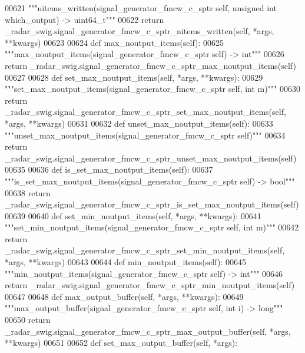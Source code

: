 \begin{DoxyCode}
{{{{00621         \textcolor{stringliteral}{"""nitems\_written(signal\_generator\_fmcw\_c\_sptr self, unsigned int which\_output) -> uint64\_t"""}
00622         \textcolor{keywordflow}{return} \_radar\_swig.signal\_generator\_fmcw\_c\_sptr\_nitems\_written(self, *args, **kwargs)
00623 
00624     \textcolor{keyword}{def }max_noutput_items(self):
00625         \textcolor{stringliteral}{"""max\_noutput\_items(signal\_generator\_fmcw\_c\_sptr self) -> int"""}
00626         \textcolor{keywordflow}{return} \_radar\_swig.signal\_generator\_fmcw\_c\_sptr\_max\_noutput\_items(self)
00627 
00628     \textcolor{keyword}{def }set_max_noutput_items(self, *args, **kwargs):
00629         \textcolor{stringliteral}{"""set\_max\_noutput\_items(signal\_generator\_fmcw\_c\_sptr self, int m)"""}
00630         \textcolor{keywordflow}{return} \_radar\_swig.signal\_generator\_fmcw\_c\_sptr\_set\_max\_noutput\_items(self, *args, **kwargs)
00631 
00632     \textcolor{keyword}{def }unset_max_noutput_items(self):
00633         \textcolor{stringliteral}{"""unset\_max\_noutput\_items(signal\_generator\_fmcw\_c\_sptr self)"""}
00634         \textcolor{keywordflow}{return} \_radar\_swig.signal\_generator\_fmcw\_c\_sptr\_unset\_max\_noutput\_items(self)
00635 
00636     \textcolor{keyword}{def }is_set_max_noutput_items(self):
00637         \textcolor{stringliteral}{"""is\_set\_max\_noutput\_items(signal\_generator\_fmcw\_c\_sptr self) -> bool"""}
00638         \textcolor{keywordflow}{return} \_radar\_swig.signal\_generator\_fmcw\_c\_sptr\_is\_set\_max\_noutput\_items(self)
00639 
00640     \textcolor{keyword}{def }set_min_noutput_items(self, *args, **kwargs):
00641         \textcolor{stringliteral}{"""set\_min\_noutput\_items(signal\_generator\_fmcw\_c\_sptr self, int m)"""}
00642         \textcolor{keywordflow}{return} \_radar\_swig.signal\_generator\_fmcw\_c\_sptr\_set\_min\_noutput\_items(self, *args, **kwargs)
00643 
00644     \textcolor{keyword}{def }min_noutput_items(self):
00645         \textcolor{stringliteral}{"""min\_noutput\_items(signal\_generator\_fmcw\_c\_sptr self) -> int"""}
00646         \textcolor{keywordflow}{return} \_radar\_swig.signal\_generator\_fmcw\_c\_sptr\_min\_noutput\_items(self)
00647 
00648     \textcolor{keyword}{def }max_output_buffer(self, *args, **kwargs):
00649         \textcolor{stringliteral}{"""max\_output\_buffer(signal\_generator\_fmcw\_c\_sptr self, int i) -> long"""}
00650         \textcolor{keywordflow}{return} \_radar\_swig.signal\_generator\_fmcw\_c\_sptr\_max\_output\_buffer(self, *args, **kwargs)
00651 
00652     \textcolor{keyword}{def }set_max_output_buffer(self, *args):
}}}}
\end{DoxyCode}
